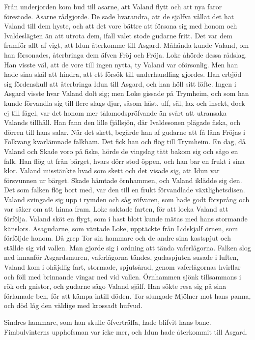Från underjorden kom bud till asarne, att Valand flytt och att nya faror
förestode. Asarne rådgjorde. De sade hvarandra, att de själfva vållat
det hat Valand till dem hyste,
och att det vore bättre att försona sig med honom och Ivaldeslägten än
att utrota dem, ifall valet stode gudarne fritt. Det var dem framför
allt af vigt, att Idun återkomme till Asgard. Måhända kunde Valand, om
han försonades, återbringa dem äfven Fröj och Fröja. Loke åhörde dessa
rådslag. Han visste väl, att de vore till ingen nytta, ty Valand var
oförsonlig. Men han hade sina skäl att hindra, att ett försök till
underhandling gjordes. Han erbjöd sig fördenskull att återbringa Idun
till Asgard, och han höll sitt löfte. Ingen i Asgard visste hvar Valand
dolt sig; men Loke gissade på Trymheim, och som han kunde förvandla sig
till flere slags djur, såsom häst, ulf, säl, lax och insekt, dock ej
till fågel, var det honom mer tålamodspröfvande än svårt att utransaka
Valands tillhåll. Han fann den lille fjällsjön, där Ivaldesonen plägade
fiska, och dörren till hans salar. När det skett, begärde han af gudarne
att få låna Fröjas i Folkvang kvarlämnade falkham. Det fick han och flög
till Trymheim. En dag, då Valand och Skade voro på fiske, hörde de
vingslag tätt bakom sig och sågo en falk. Han flög ut från bärget, hvars
dörr stod öppen, och han bar en frukt i sina klor. Valand misstänkte
hvad som skett och det visade sig, att Idun var försvunnen ur bärget.
Skade hämtade örnhammen, och Valand iklädde sig den. Det som falken flög
bort med, var den till en frukt förvandlade växtlighetsdisen. Valand
svingade sig upp i rymden och såg röfvaren, som hade godt försprång och
var säker om att hinna fram. Loke saktade farten, för att locka Valand
att förfölja. Valand sköt en flygt, som i hast blott kunde mätas med
hans stormande känslors. Asagudarne, som väntade Loke, upptäckte från
Lidskjalf örnen, som förföljde honom. Då grep Tor sin hammare och de
andre sina kastspjut och ställde sig vid vallen. Man gjorde sig i
ordning att tända vaferlågorna. Falken slog ned innanför Asgardsmuren,
vaferlågorna tändes, gudaspjuten susade i luften, Valand kom i ohäjdlig
fart, stormade, spjutsårad, genom vaferlågornas hvirflar och föll med
brinnande vingar ned vid vallen. Örnhammen sjönk tillsammans i rök och
gnistor, och
gudarne sågo Valand själf. Han sökte resa sig på sina förlamade ben, för
att kämpa intill döden. Tor slungade Mjölner mot hans panna, och död låg
den väldige med krossadt hufvud.

Sindres hammare, som han skulle öfverträffa, hade blifvit hans bane.
Fimbulvinterns upphofsman var icke mer, och Idun hade återkommit till
Asgard.

